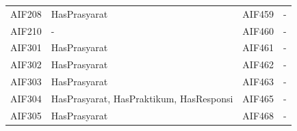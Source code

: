 \begin{enumerate}
\begin{table}[H]
\begin{tabular}{|p{2.125cm}|p{4.9cm}|p{2.125cm}|p{4.9cm}|}
    AIF208  & HasPrasyarat   &    AIF459  & -  						 \\
    AIF210  & -       		 &    AIF460  & -                          \\
    AIF301  & HasPrasyarat   &    AIF461  & -     					 \\
		AIF302  & HasPrasyarat	 &    AIF462  & -					        \\
    AIF303  & HasPrasyarat   &    AIF463  & -                          \\
    AIF304  & HasPrasyarat, HasPraktikum, HasResponsi &    AIF465  & -                          \\
    AIF305  & HasPrasyarat &    AIF468  & -                          \\
		\hline
    \end{tabular}
		
	\label{tab:2_kelas_matakuliah}
\end{table}


\end{enumerate}
